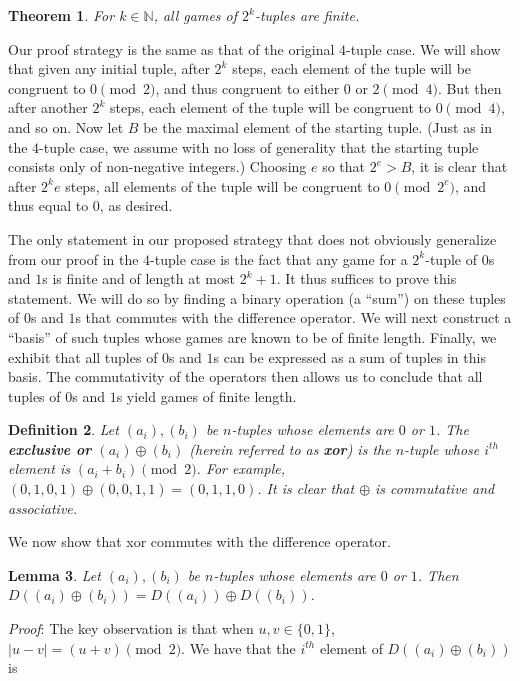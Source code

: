 \documentclass[12pt]{amsart}
\newtheorem{theorem}{Theorem}[section]
\newtheorem{definition}[theorem]{Definition}
\newtheorem{lemma}[theorem]{Lemma}
\newcommand{\xor}{\oplus}
\newcommand{\znn}{\mathbb{N}}
\begin{document}
\begin{theorem}
For $k\in \znn$, all games of $2^k$-tuples are finite.
\end{theorem}

Our proof strategy is the same as that of the original $4$-tuple case. We will show that given any initial tuple, after $2^k$ steps, each element of the tuple will be congruent to $0\pmod{2}$, and thus congruent to either $0$ or $2\pmod{4}$. But then after another $2^k$ steps, each element of the tuple will be congruent to $0\pmod{4}$, and so on. Now let $B$ be the maximal element of the starting tuple. (Just as in the $4$-tuple case, we assume with no loss of generality that the starting tuple consists only of non-negative integers.) Choosing $e$ so that $2^e>B$, it is clear that after $2^ke$ steps, all elements of the tuple will be congruent to $0\pmod{2^e}$, and thus equal to $0$, as desired.

The only statement in our proposed strategy that does not obviously generalize from our proof in the $4$-tuple case is the fact that any game for a $2^k$-tuple of $0$s and $1$s is finite and of length at most $2^k+1$. It thus suffices to prove this statement. We will do so by finding a binary operation (a ``sum'') on these tuples of $0$s and $1$s that commutes with the difference operator. We will next construct a ``basis'' of such tuples whose games are known to be of finite length. Finally, we exhibit that all tuples of $0$s and $1$s can be expressed as a sum of tuples in this basis. The commutativity of the operators then allows us to conclude that all tuples of $0$s and $1$s yield games of finite length.

\begin{definition}
Let $(a_i),(b_i)$ be $n$-tuples whose elements are $0$ or $1$. The \textbf{exclusive or} $(a_i)\xor (b_i)$ (herein referred to as \textbf{xor}) is the $n$-tuple whose $i^{th}$ element is $(a_i+b_i)\pmod{2}$. For example, $(0,1,0,1)\xor(0,0,1,1)=(0,1,1,0)$. It is clear that $\xor$ is commutative and associative.
\end{definition}

We now show that xor commutes with the difference operator.

\begin{lemma}
Let $(a_i),(b_i)$ be $n$-tuples whose elements are $0$ or $1$. Then $D((a_i)\xor (b_i))=D((a_i))\xor D((b_i))$.
\end{lemma}

\textit{Proof}: The key observation is that when $u,v\in \{0,1\}$, $|u-v|=(u+v)\pmod{2}$. We have that the $i^{th}$ element of $D((a_i)\xor (b_i))$ is
\end{document}
